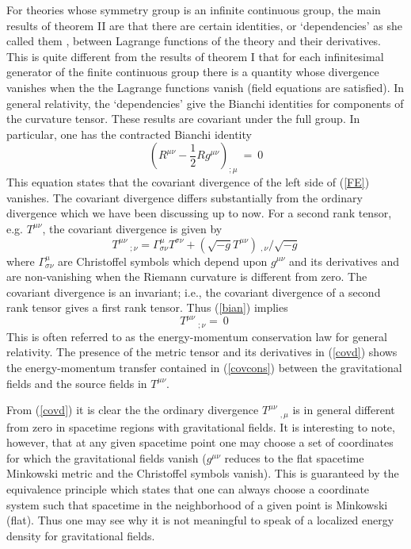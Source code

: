 \documentclass[12pt]{article}
\begin{document}
For theories whose symmetry group is an infinite continuous group, the main
results of theorem II are that there are certain identities, or `dependencies' as she called them
\cite{noet}, between 
Lagrange functions of the
theory and their derivatives.  This is quite different from the results of
theorem I that for each infinitesimal generator of the finite
continuous group there is a quantity whose divergence vanishes when the
 the Lagrange functions vanish (field equations are satisfied).
In general relativity, the `dependencies'  give the Bianchi
identities for components of the curvature tensor. These results
are covariant under the full group.
In particular, one has 
the contracted Bianchi identity
\begin{equation}
(R^{\mu\nu}  -  {\frac{1}{2}}Rg^{\mu\nu})_{;\mu} ~=~0    \label{bian}
\end{equation}
This equation states that the covariant divergence of the left side of (\ref{FE}) vanishes.
The covariant divergence differs substantially from the ordinary divergence
which we have been discussing up to now.  For a second rank tensor, e.g. 
$T^{\mu\nu}$,
the covariant divergence
  is given by
 \begin{equation}
T^{\mu\nu} ~  _{ ;\nu} = \Gamma^\mu_{\sigma\nu} T^{\sigma\nu} +(\sqrt{-g}
T^{\mu\nu}) ~ _{,\nu}/\sqrt{-g} \label{covd}
\end{equation}
 where $\Gamma^\mu_{\sigma\nu}$ are Christoffel symbols which depend upon
 $g^{\mu\nu}$ and its derivatives and are
non-vanishing when the Riemann curvature is different from zero.
The covariant divergence is an invariant; i.e., the covariant divergence
of a second rank tensor gives a first rank tensor. Thus (\ref{bian})
 implies
\begin{equation}
T^{\mu\nu} ~  _{ ;\nu} = ~0 \; \label{covcons}
\end{equation}
This is often referred to as the  energy-momentum conservation law
for general relativity. The presence of the metric tensor and its
derivatives in (\ref{covd}) shows the energy-momentum transfer 
contained in (\ref{covcons}) between the gravitational
fields and the source fields in $T^{\mu\nu}$.

From
(\ref{covd}) it is clear the the ordinary divergence $T^{\mu\nu}~_{,\mu}$
is in general different from zero in spacetime regions with gravitational
 fields. It is interesting to note, however, that 
at any given spacetime point one may choose a set of coordinates for which
the gravitational fields vanish  ($g^{\mu\nu}$ reduces to the flat spacetime
Minkowski metric and the Christoffel symbols vanish). This is
guaranteed by the equivalence
principle which states that one can always choose a coordinate system such 
that spacetime in the neighborhood of a given
point is Minkowski (flat). Thus one may see why it is not meaningful to speak
of a localized energy density for gravitational fields.
\end{document}
